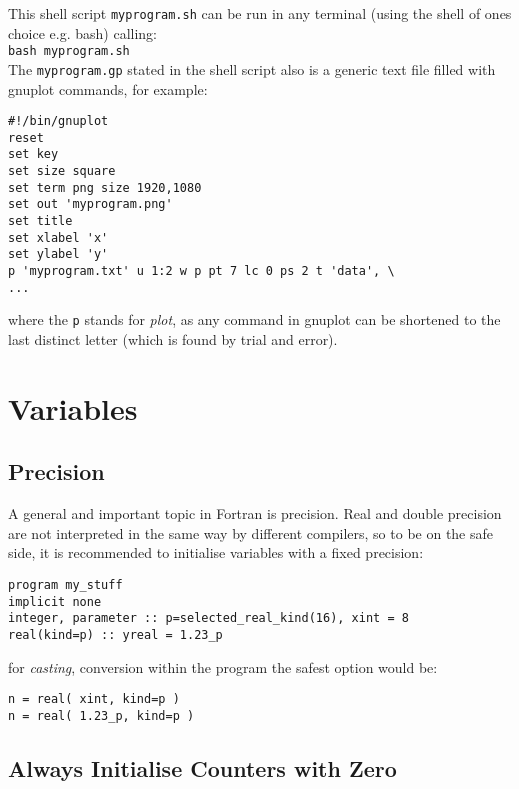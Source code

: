 \documentclass{article}
\begin{document}
This shell script \verb|myprogram.sh| can be run in any terminal (using the shell of ones choice e.g. bash) calling:\\

\noindent
\verb|bash myprogram.sh|\\

The \verb|myprogram.gp| stated in the shell script also is a generic text file filled with gnuplot commands, for example:

\begin{verbatim}
#!/bin/gnuplot
reset
set key
set size square
set term png size 1920,1080
set out 'myprogram.png'
set title
set xlabel 'x'
set ylabel 'y'
p 'myprogram.txt' u 1:2 w p pt 7 lc 0 ps 2 t 'data', \
...
\end{verbatim}

where the \verb|p| stands for \emph{plot}, as any command in gnuplot can be shortened to the last distinct letter (which is found by trial and error).


\section{Variables}

\subsection{Precision}

A general and important topic in Fortran is precision. Real and double precision are not interpreted in the same way by different compilers, so to be on the safe side, it is recommended to initialise variables with a fixed precision:

\begin{verbatim}
program my_stuff
implicit none
integer, parameter :: p=selected_real_kind(16), xint = 8
real(kind=p) :: yreal = 1.23_p
\end{verbatim}

\noindent
for \emph{casting}, conversion within the program the safest option would be:

\begin{verbatim}
n = real( xint, kind=p )
n = real( 1.23_p, kind=p )
\end{verbatim}


\subsection{Always Initialise Counters with Zero}
\end{document}
